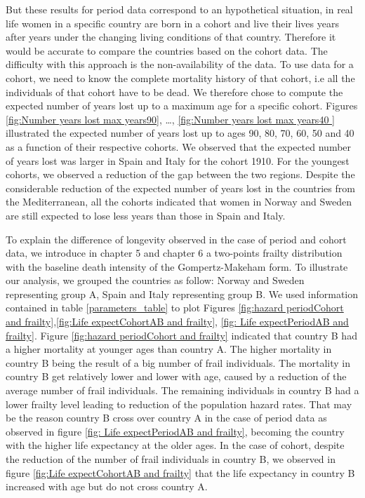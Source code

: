 But these results for period data correspond to an hypothetical situation, in real life women in a specific country are born in a cohort and live their lives years after years under the changing living conditions of that country. Therefore it would be accurate to compare the countries based on the cohort data. The difficulty with this approach is the non-availability of the data. To use data for a cohort, we need to know the complete mortality history of that cohort, i.e all the individuals of that cohort have to be dead. We therefore chose to compute the expected number of years lost up to a maximum age for a specific cohort. Figures \ref{fig:Number years lost max years90}, \dots, \ref{fig:Number years lost max years40 } illustrated the expected number of years lost up to ages 90, 80, 70, 60, 50 and 40 as a function of their respective cohorts. We observed that the expected number of years lost was larger in Spain and Italy for the cohort 1910. For the youngest cohorts, we observed a reduction of the gap between the two regions. Despite the considerable reduction of the expected number of years lost in the countries from the Mediterranean, all the cohorts indicated that women in Norway and Sweden are still expected to lose less years than those in Spain and Italy.

To explain the difference of longevity observed in the case of period and cohort data, we introduce in chapter 5 and chapter 6 a two-points frailty distribution with the baseline death intensity of the Gompertz-Makeham form. 
To illustrate our analysis, we grouped the countries as follow: Norway and Sweden representing group A, Spain and Italy representing group B. 
We used information contained in table \ref{parameters_table} to plot Figures \ref{fig:hazard periodCohort and frailty},\ref{fig:Life expectCohortAB and frailty}, \ref{fig: Life expectPeriodAB and frailty}.
Figure \ref{fig:hazard periodCohort and frailty} indicated that country B had a higher mortality at younger ages than country A. The higher mortality in country B being the result of a big number of frail individuals. The mortality in country B get relatively lower and lower with age, caused by a reduction of the average number of frail individuals. The remaining individuals in country B had a lower frailty level leading to reduction of the population hazard rates. That may be the reason country B cross over country A in the case of period data as observed in figure  \ref{fig: Life expectPeriodAB and frailty}, becoming the country with the higher life expectancy at the older ages. In the case of cohort, despite the reduction of the number of frail individuals in country B, we observed in figure \ref{fig:Life expectCohortAB and frailty} that  the life expectancy in country B increased with age but do not cross country A.

